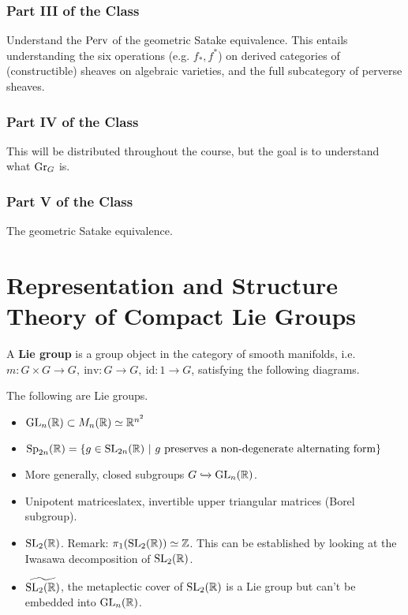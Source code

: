 \subsubsection{Part III of the Class} Understand the $\mathrm{Perv}$ of the geometric
Satake equivalence. This entails understanding the six operations (e.g. $f_*,
f^*$) on derived categories of (constructible) sheaves on algebraic varieties,
and the full subcategory of perverse sheaves.

\subsubsection{Part IV of the Class} This will be distributed throughout the
course, but the goal is to understand what $\mathrm{Gr}_{G}$ is.

\subsubsection{Part V of the Class} The geometric Satake equivalence.

\section{Representation and Structure Theory of Compact Lie Groups}

\begin{defn}
A \textbf{Lie group} is a group object in the category of smooth manifolds, i.e.
$m: G \times G \rightarrow G, \ \mathrm{inv}: G \rightarrow G,
\ \mathrm{id}: {1} \rightarrow G$, satisfying the following diagrams.

\end{defn}

\begin{exmpl}
The following are Lie groups.

\begin{itemize}
\item $\mathrm{GL}_{n}({\mathbb{R}}) \subset M_n(\mathbb{R}) \simeq \mathbb{R}^{n^2}$
\item $\mathrm{Sp}_{2n}({\mathbb{R}}) = \{ g \in \mathrm{SL}_{2n}({\mathbb{R}}) \ | \
  g \ \textrm{preserves a non-degenerate alternating form} \}$
\item More generally, closed subgroups $G \xhookrightarrow{} \mathrm{GL}_{n}({\mathbb{R}})$.
\item Unipotent matriceslatex, invertible upper triangular matrices (Borel subgroup).
\item $\mathrm{SL}_{2}({\mathbb{R}})$. Remark: $\pi_1(\mathrm{SL}_{2}({\mathbb{R}})) \simeq \mathbb{Z}$. This can be
established by looking at the Iwasawa decomposition of $\mathrm{SL}_{2}({\mathbb{R}})$.
\item $\widetilde{\mathrm{SL}_{2}({\mathbb{R}})}$, the metaplectic cover of $\mathrm{SL}_{2}({\mathbb{R}})$ is a
Lie group but can't be embedded into $\mathrm{GL}_{n}({\mathbb{R}})$.
\end{itemize}
\end{exmpl}

